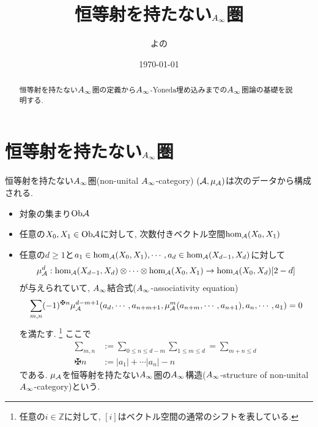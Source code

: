 \documentclass[uplatex, a4paper, 14Q, dvipdfmx]{jsarticle}
\title{恒等射を持たない\texorpdfstring{$A_{\infty}$}{Ainf}圏}
\author{よの}
\date{\today}
\begin{document}
\maketitle

\begin{abstract}
  恒等射を持たない$A_{\infty}$圏の定義から$A_{\infty}$-Yoneda埋め込みまでの$A_{\infty}$圏論の基礎を説明する. 
\end{abstract}

\tableofcontents

\section{恒等射を持たない\texorpdfstring{$A_{\infty}$}{Ainf}圏} \label{section_non_unital_Ainf_cat}

\begin{definition} \label{def_non_unital_Ainf_cat}
  恒等射を持たない$A_{\infty}$圏(non-unital $A_{\infty}$-category) $(\mathcal{A},\mu_{\mathcal{A}})$は次のデータから構成される. 
  \begin{itemize}
    \item 対象の集まり$\mathrm{Ob}\mathcal{A}$ 
    \item 任意の$X_0, X_1 \in \mathrm{Ob}\mathcal{A}$に対して, 次数付きベクトル空間$\hom_{\mathcal{A}}(X_0,X_1)$
    \item 任意の$d \geq 1$と$a_1 \in \hom_{\mathcal{A}}(X_0,X_1), \cdots, a_d \in \hom_{\mathcal{A}}(X_{d-1},X_d)$に対して
    \begin{align*}
      \mu^d_{\mathcal{A}} : \hom_{\mathcal{A}}(X_{d-1},X_d) \otimes \cdots \otimes \hom_{\mathcal{A}}(X_0,X_1) \to \hom_{\mathcal{A}}(X_0,X_d)[2-d]
    \end{align*}
    が与えられていて, $A_{\infty}$結合式($A_{\infty}$-associativity equation) 
    \begin{align*}
      \sum_{m,n} (-1)^{\maltese n} \mu^{d-m+1}_\A(a_d,\cdots,a_{n+m+1}, \mu^m_\A(a_{n+m},\cdots,a_{n+1}), a_n,\cdots,a_1)
      = 0
    \end{align*}
    を満たす.
    \footnote{
      任意の$i \in \mathbb{Z}$に対して, $[i]$はベクトル空間の通常のシフトを表している.
    }
    ここで
    \begin{align*}
      \sum_{m,n} &:= \sum_{0 \leq n \leq d-m} \sum_{1 \leq m \leq d} = \sum_{m+n \leq d} \\
      \maltese n &:= |a_1| + \cdots |a_n| - n
    \end{align*}
    である. 
    $\mu_{\mathcal{A}}$を恒等射を持たない$A_{\infty}$圏の$A_{\infty}$構造($A_{\infty}$-structure of non-unital $A_{\infty}$-category)という. 
  \end{itemize}
\end{definition}
\end{document}
